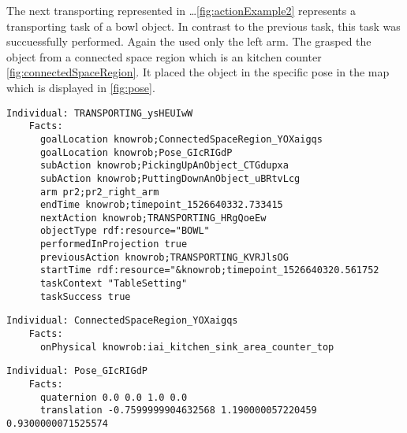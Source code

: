 	The next transporting represented in \dots \ref{fig:actionExample2} represents a transporting task of a bowl object.
	In contrast to the previous task, this task was succuessfully performed.
	Again the \pr used only the left arm.
	The \pr grasped the object from a connected space region which is an kitchen counter \ref{fig:connectedSpaceRegion}.
	It placed the object in the specific pose in the map which is displayed in \ref{fig:pose}.
	

\begin{minipage}{\textwidth}
\scriptsize
\begin{lstlisting}[frame=single]
  Individual: TRANSPORTING_ysHEUIwW
	Facts: 
	  goalLocation knowrob;ConnectedSpaceRegion_YOXaigqs
	  goalLocation knowrob;Pose_GIcRIGdP
	  subAction knowrob;PickingUpAnObject_CTGdupxa
      subAction knowrob;PuttingDownAnObject_uBRtvLcg
      arm pr2;pr2_right_arm
      endTime knowrob;timepoint_1526640332.733415
      nextAction knowrob;TRANSPORTING_HRgQoeEw
      objectType rdf:resource="BOWL"
      performedInProjection true
      previousAction knowrob;TRANSPORTING_KVRJlsOG
      startTime rdf:resource="&knowrob;timepoint_1526640320.561752
	  taskContext "TableSetting"
	  taskSuccess true
\end{lstlisting}
\vspace{2mm}
\label{fig:actionExample2}
\end{minipage}


\begin{minipage}{\textwidth}
	\scriptsize
\begin{lstlisting}[frame=single]
  Individual: ConnectedSpaceRegion_YOXaigqs
	Facts: 
	  onPhysical knowrob:iai_kitchen_sink_area_counter_top
\end{lstlisting}
	\vspace{2mm}
	\label{fig:connectedSpaceRegion}
\end{minipage}


\begin{minipage}{\textwidth}
	\scriptsize
\begin{lstlisting}[frame=single]
  Individual: Pose_GIcRIGdP
    Facts: 
	  quaternion 0.0 0.0 1.0 0.0
	  translation -0.7599999904632568 1.190000057220459 0.9300000071525574
\end{lstlisting}
	\vspace{2mm}
	\label{fig:pose}
\end{minipage}